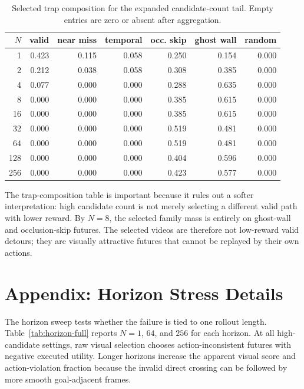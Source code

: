 \documentclass{article}
\begin{document}
\begin{table}[tbp]
  \centering
  \small
  \caption{Selected trap composition for the expanded candidate-count tail. Empty entries are zero or absent after aggregation.}
  \label{tab:tail-trap-expanded}
  \begin{tabular}{@{}rrrrrrr@{}}
    \toprule
    \(N\) & valid & near miss & temporal & occ. skip & ghost wall & random \\
    \midrule
    1 & 0.423 & 0.115 & 0.058 & 0.250 & 0.154 & 0.000 \\
    2 & 0.212 & 0.038 & 0.058 & 0.308 & 0.385 & 0.000 \\
    4 & 0.077 & 0.000 & 0.000 & 0.288 & 0.635 & 0.000 \\
    8 & 0.000 & 0.000 & 0.000 & 0.385 & 0.615 & 0.000 \\
    16 & 0.000 & 0.000 & 0.000 & 0.385 & 0.615 & 0.000 \\
    32 & 0.000 & 0.000 & 0.000 & 0.519 & 0.481 & 0.000 \\
    64 & 0.000 & 0.000 & 0.000 & 0.519 & 0.481 & 0.000 \\
    128 & 0.000 & 0.000 & 0.000 & 0.404 & 0.596 & 0.000 \\
    256 & 0.000 & 0.000 & 0.000 & 0.423 & 0.577 & 0.000 \\
    \bottomrule
  \end{tabular}
\end{table}

The trap-composition table is important because it rules out a softer interpretation: high candidate count is not merely selecting a different valid path with lower reward. By \(N=8\), the selected family mass is entirely on ghost-wall and occlusion-skip futures. The selected videos are therefore not low-reward valid detours; they are visually attractive futures that cannot be replayed by their own actions.

\section{Appendix: Horizon Stress Details}
\label{app:horizon-details}

The horizon sweep tests whether the failure is tied to one rollout length. Table~\ref{tab:horizon-full} reports \(N=1\), \(64\), and \(256\) for each horizon. At all high-candidate settings, raw visual selection chooses action-inconsistent futures with negative executed utility. Longer horizons increase the apparent visual score and action-violation fraction because the invalid direct crossing can be followed by more smooth goal-adjacent frames.
\end{document}
